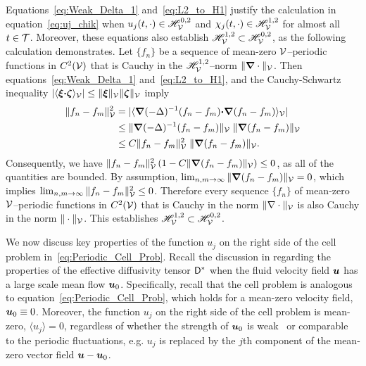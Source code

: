 \documentclass[amsa]{ipart}
\begin{document}
Equations~\eqref{eq:Weak_Delta_1} and~\eqref{eq:L2_to_H1} justify the
calculation 
in equation~\eqref{eq:uj_chik} when $u_j(t,\cdot)\in\mathscr{H}^{0,2}_{\mathcal{V}}$ and
$\chi_j(t,\cdot)\in\mathscr{H}^{1,2}_{\mathcal{V}}$ for almost all $t\in\mathcal{T}$. Moreover, these
equations also establish $\mathscr{H}^{1,2}_{\mathcal{V}}\subset\mathscr{H}^{0,2}_{\mathcal{V}}$, as the following
calculation demonstrates. Let $\{f_n\}$ be a sequence of mean-zero
$\mathcal{V}$--periodic functions in $C^2(\mathcal{V})$ that is Cauchy in the
$\mathscr{H}^{1,2}_{\mathcal{V}}$--norm $\|\mbox{\boldmath${\nabla}$}\cdot\|_{\mathcal{V}}$. Then
equations~\eqref{eq:Weak_Delta_1} and~\eqref{eq:L2_to_H1}, and the
Cauchy-Schwartz inequality
$|\langle\boldsymbol{\xi}\mbox{\boldmath${\cdot}$}\boldsymbol{\zeta}\rangle_{\mathcal{V}}|\leq\|\boldsymbol{\xi}\|_{\mathcal{V}}\|\boldsymbol{\zeta}\|_{\mathcal{V}}$ imply   
%
\begin{align}
  \|f_n-f_m\|^2_{\Vc}&=|\langle\bnabla(-\Delta)^{-1}(f_n-f_m)\bcdot\bnabla(f_n-f_m)\rangle_{\Vc}|
           \\\notag
           &\leq\|\bnabla(-\Delta)^{-1}(f_n-f_m)\|_{\Vc}\;\|\bnabla(f_n-f_m)\|_{\Vc}
           \\\notag
           &\leq C\|f_n-f_m\|^2_{\Vc}\;\|\bnabla(f_n-f_m)\|_{\Vc}.
           \notag
\end{align}
%
Consequently, we have 
$\|f_n-f_m\|^2_{\mathcal{V}}\,(1-C\|\mbox{\boldmath${\nabla}$}(f_n-f_m)\|_{\mathcal{V}})\leq0$, as all of the
quantities are bounded. By assumption,
$\lim_{n,m\to\infty}\|\mbox{\boldmath${\nabla}$}(f_n-f_m)\|_{\mathcal{V}}=0$, which implies
$\lim_{n,m\to\infty}\|f_n-f_m\|^2_{\mathcal{V}}\leq0$. Therefore every sequence $\{f_n\}$ of
mean-zero $\mathcal{V}$--periodic functions in $C^2(\mathcal{V})$ that is Cauchy in
the norm $\|\nabla\cdot\|_{\mathcal{V}}$ is also Cauchy in the norm $\|\cdot\|_{\mathcal{V}}$. This
establishes $\mathscr{H}^{1,2}_{\mathcal{V}}\subset\mathscr{H}^{0,2}_{\mathcal{V}}$. 




We now discuss key properties of the function $u_j$ on the right
side of the cell problem in~\eqref{eq:Periodic_Cell_Prob}. Recall the 
discussion in  regarding the properties of the
effective diffusivity tensor $\mathsf{D}^*$ when the fluid velocity field
$\boldsymbol{u}$ has a large scale mean flow $\boldsymbol{u}_0$. Specifically, recall
that the cell problem is analogous to
equation~\eqref{eq:Periodic_Cell_Prob}, which holds for a mean-zero
velocity field, $\boldsymbol{u}_0\equiv0$. Moreover, the function $u_j$ on the right
side of the cell problem is mean-zero, $\langle u_j\rangle=0$, regardless of
whether the strength of $\boldsymbol{u}_0$ is
weak~\cite{Majda:Kramer:1999:book,Pavliotis:PHD_Thesis} or
comparable~\cite{Pavliotis:PHD_Thesis} to the periodic fluctuations,
e.g. $u_j$ is replaced by the $j$th component of the mean-zero vector
field $\boldsymbol{u}-\boldsymbol{u}_0$.  
\end{document}
